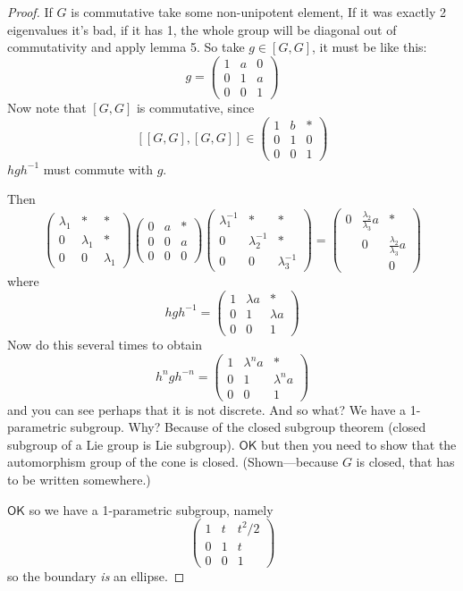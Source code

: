 \begin{proof}\leavevmode
	If $G$ is commutative take some non-unipotent element, If it was exactly 2 eigenvalues it's bad, if it has 1, the whole group will be diagonal out of commutativity and apply lemma 5. So take $g\in [G,G]$, it must be like this:
\[g=\begin{pmatrix} 1 & a & 0 \\ 0 & 1 & a \\ 0 & 0 & 1 \end{pmatrix} \]
Now note that $[G,G]$ is commutative, since  \[[ [G,G],[G,G]]\in\begin{pmatrix} 1 & b & *\\ 0 & 1 & 0\\ 0 & 0 & 1 \end{pmatrix} \] $hgh^{-1}$ must commute with $g$.

Then \[\begin{pmatrix} \lambda_1 & * & *\\ 0 & \lambda_1 & *\\ 0 & 0 & \lambda_1 \end{pmatrix} \begin{pmatrix} 0 & a & * \\ 0 & 0 & a\\ 0 & 0 & 0 \end{pmatrix} \begin{pmatrix} \lambda_1^{-1} & * & *\\ 0 & \lambda_2^{-1} & *\\ 0 & 0 & \lambda_3^{-1} \end{pmatrix}=\begin{pmatrix}  0 &  \frac{\lambda_2}{\lambda_3}a &  *\\ &  0 &  \frac{\lambda_2}{\lambda_3}a\\ & & 0 \end{pmatrix} \]
where
\[hgh^{-1}=\begin{pmatrix} 1 & \lambda a & *\\ 0 & 1 & \lambda a\\ 0 & 0 & 1 \end{pmatrix} \]Now do this several times to obtain
\[h^ngh^{-n}=\begin{pmatrix} 1 & \lambda^na & *\\ 0 & 1 & \lambda^n a\\0 & 0 & 1 \end{pmatrix} \]
and you can see perhaps that it is not discrete. And so what? We have a 1-parametric subgroup. Why? Because of the closed subgroup theorem (closed subgroup of a Lie group is Lie subgroup). $\mathsf{OK}$ but then you need to show that the automorphism group of the cone is closed. (Shown---because $G$ is closed, that has to be written somewhere.)

$\mathsf{OK}$ so we have a 1-parametric subgroup, namely
\[\begin{pmatrix} 1 & t & t^2/2\\ 0 & 1 & t\\ 0 & 0 & 1 \end{pmatrix} \]
so the boundary \textit{is} an ellipse.
\end{proof}


